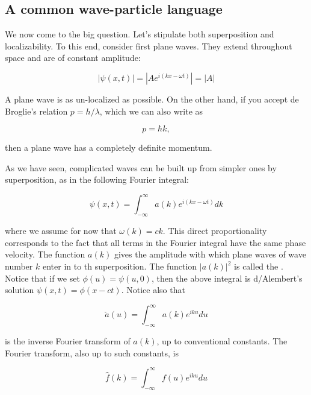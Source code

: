 \subsection{A common wave-particle language}

We now come to the big question.   Let's stipulate both superposition and localizability.  To this end, consider first plane waves.  They extend throughout space and are of constant amplitude:

\begin{equation}
|\psi(x,t)| = |Ae^{i(kx - \omega t)}| = |A| 
\end{equation}

A plane wave is as un-localized as possible.   On the other hand, if you accept de Broglie's relation $p = h/\lambda$, which we can also write as

\begin{equation}
p = \hbar k,
\end{equation}

then a plane wave has a completely definite momentum.

As we have seen, complicated waves can be built up from simpler ones by superposition, as in the following Fourier integral:

\begin{equation}
\psi(x,t) = \int_{-\infty}^\infty a(k) e^{i(kx - \omega t)}dk
\end{equation}

where we assume for now that $\omega(k) = ck$.  This  direct proportionality corresponds to the fact that all terms in the Fourier integral have the same phase velocity.  The function $a(k)$ gives the amplitude with which plane waves of wave number $k$ enter in to th superposition.  The function $|a(k)|^2$ is called the .  Notice that if we set  $\phi(u) = \psi(u,0)$, then the above integral is d/Alembert's solution $\psi(x,t) = \phi(x - ct)$.  Notice also  that 

\begin{equation}
\check a(u) = \int_{-\infty}^\infty a(k) e^{iku} du
\end{equation}

is the inverse Fourier transform of $a(k)$, up to conventional constants.  The Fourier transform, also up to such constants, is

\begin{equation}
\hat f(k) = \int_{-\infty}^\infty f(u) e^{iku} du
\end{equation}

